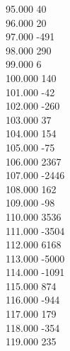 { 95.000	40 \\
 96.000	20 \\
 97.000	-491 \\
 98.000	290 \\
 99.000	6 \\
 100.000	140 \\
 101.000	-42 \\
 102.000	-260 \\
 103.000	37 \\
 104.000	154 \\
 105.000	-75 \\
 106.000	2367 \\
 107.000	-2446 \\
 108.000	162 \\
 109.000	-98 \\
 110.000	3536 \\
 111.000	-3504 \\
 112.000	6168 \\
 113.000	-5000 \\
 114.000	-1091 \\
 115.000	874 \\
 116.000	-944 \\
 117.000	179 \\
 118.000	-354 \\
 119.000	235 \\
}
